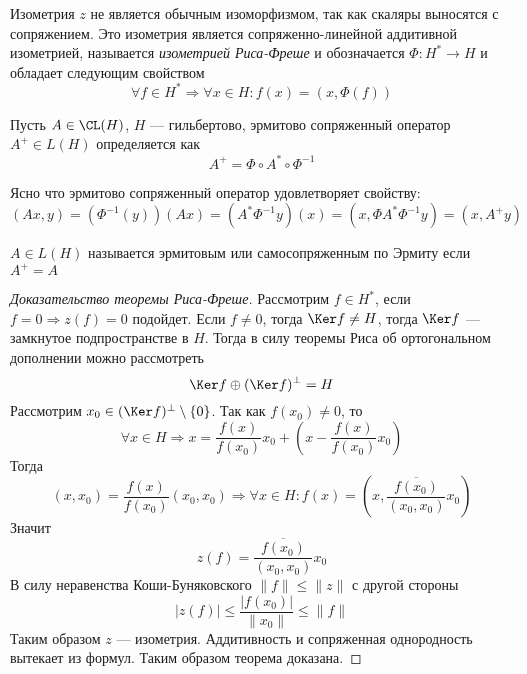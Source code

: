 \begin{definition}
	Изометрия $z$ не является обычным изоморфизмом, так как скаляры выносятся с сопряжением. Это изометрия является сопряженно-линейной аддитивной изометрией, называется  \textit{изометрией Риса-Фреше} и обозначается $\Phi : H^* \to H$ и обладает следующим свойством 
	$$
	\forall f \in H^* \Rightarrow \forall x \in H \colon f(x) = (x, \Phi(f))
	$$
\end{definition}
\begin{definition}
	Пусть $A \in \CL(H)$, $H$ --- гильбертово, эрмитово сопряженный оператор $A^+ \in L(H)$ определяется как 
	$$
	A^+  =\Phi \circ A^* \circ \Phi^{-1}
	$$
\end{definition}
\begin{remark}
	Ясно что эрмитово сопряженный оператор удовлетворяет свойству:
$$(Ax, y) = (\Phi^{-1}(y))(Ax) = (A^*\Phi^{-1}y)(x) = (x, \Phi A^* \Phi^{-1}y) = (x,A^+y)$$
\end{remark}
\begin{definition}
	$A \in L(H)$ называется эрмитовым или самосопряженным по Эрмиту если $A^+ = A$
\end{definition}

\begin{proof}[Доказательство теоремы Риса-Фреше]
	Рассмотрим $f \in H^*$, если $ f = 0 \Rightarrow z(f) = 0$ подойдет. Если $f \neq 0$, тогда $\Ker f \neq H$, тогда $\Ker f$ --- замкнутое подпространстве в $H$. Тогда в силу теоремы Риса об ортогональном дополнении можно рассмотреть
	$$
	\Ker f \oplus (\Ker f)^\perp  = H
	$$
	Рассмотрим $x_0 \in (\Ker f)^\perp \setminus \{0\}$. Так как $f(x_0) \neq 0$, то 
	$$
	\forall x \in H\Rightarrow x =\frac{f(x)}{f(x_0)}x_0 + \left(x - \frac{f(x)}{f(x_0)}x_0\right)
	$$
	Тогда 
	$$
	(x,x_0) = \frac{f(x)}{f(x_0)}(x_0,x_0) \Rightarrow  \forall x \in H \colon f(x) = \left(x, \frac{\overline{f(x_0)}}{(x_0,x_0)}x_0\right)
	$$
	Значит 
	$$
	z(f) = \frac{\overline{f(x_0)}}{(x_0,x_0)}x_0
	$$
	В силу неравенства Коши-Буняковского $\|f\| \leq \|z\|$ с другой стороны
	$$
	|z(f)| \leq \frac{|f(x_0)|}{\|x_0\|} \leq \|f\|
	$$
	Таким образом $z$ --- изометрия. Аддитивность и сопряженная однородность вытекает из формул. Таким образом теорема доказана.
\end{proof}